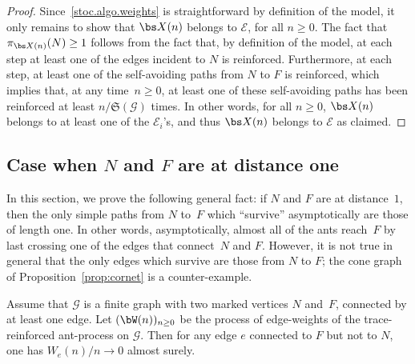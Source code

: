 \begin{proof}
Since~\eqref{stoc.algo.weights} is straightforward by definition of the model,
it only remains to show that $\bs X(n)$ belongs to $\mathcal E$, for all $n\ge 0$.
The fact that $\pi_{\bs X(n)}(N)\ge 1$ follows from the fact that, by definition of the model,
at each step at least one of the edges incident to $N$ is reinforced.
Furthermore, at each step, at least one of the self-avoiding paths from $N$ to $F$ is reinforced,
which implies that, at any time~$n\ge 0$, at least one of these self-avoiding paths has been reinforced at least ${n}/{\mathfrak S(\mathcal G)}$ times.
In other words, for all $n\geq 0$, $\bs X(n)$ belongs to at least one of the $\mathcal E_i$'s, and thus $\bs X(n)$ belongs to $\mathcal E$ as claimed.
\end{proof}

\subsection{Case when $N$ and $F$ are at distance one}
In this section, we prove the following general fact:
if $N$ and $F$ are at distance~$1$,
then the only simple paths from $N$ to~$F$ which ``survive'' asymptotically
are those of length one.
In other words, asymptotically, almost all of the ants reach~$F$ by last crossing one of the edges that connect~$N$ and $F$.
However, it is not true in general that the only edges which survive are those from $N$ to $F$; the cone graph of Proposition~\ref{prop:cornet} is a counter-example.
\begin{proposition}\label{prop:liminf_NF=1}
Assume that $\mathcal G$ is a finite graph with two marked vertices $N$ and~$F$, connected by at least one edge. Let $(\bW(n))_{n\geq 0}$ be the process of edge-weights of the trace-reinforced ant-process on $\mathcal G$.
Then for any edge $e$ connected to $F$ but not to $N$, one has $W_e(n)/n \to 0$ almost surely.
\end{proposition}

